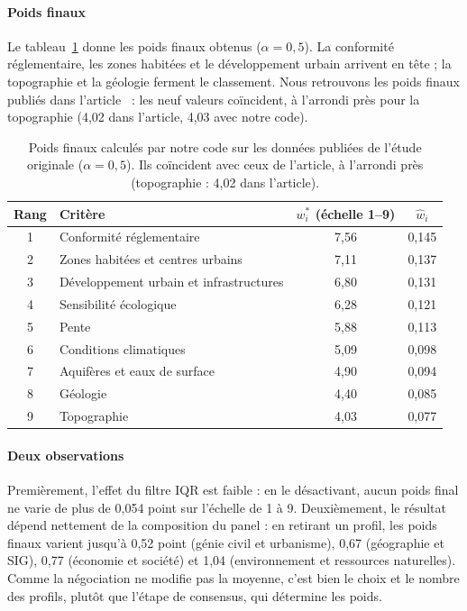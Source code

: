 \documentclass[11pt,a4paper]{article}
\begin{document}
\paragraph{Poids finaux} Le tableau~\ref{tab:poids-orig} donne les poids finaux obtenus ($\alpha=0{,}5$). La conformité réglementaire, les zones habitées et le développement urbain arrivent en tête ; la topographie et la géologie ferment le classement. Nous retrouvons les poids finaux publiés dans l'article~\cite{vahidnia} : les neuf valeurs coïncident, à l'arrondi près pour la topographie (4,02 dans l'article, 4,03 avec notre code).

\begin{table}[htbp]
\centering
\caption{Poids finaux calculés par notre code sur les données publiées de l'étude originale ($\alpha=0{,}5$). Ils coïncident avec ceux de l'article, à l'arrondi près (topographie : 4,02 dans l'article).}
\label{tab:poids-orig}
\small
\begin{tabular}{@{}cl cc@{}}
\toprule
Rang & Critère & $w_i^*$ (échelle 1--9) & $\hat w_i$ \\
\midrule
1 & Conformité réglementaire & 7,56 & 0,145 \\
2 & Zones habitées et centres urbains & 7,11 & 0,137 \\
3 & Développement urbain et infrastructures & 6,80 & 0,131 \\
4 & Sensibilité écologique & 6,28 & 0,121 \\
5 & Pente & 5,88 & 0,113 \\
6 & Conditions climatiques & 5,09 & 0,098 \\
7 & Aquifères et eaux de surface & 4,90 & 0,094 \\
8 & Géologie & 4,40 & 0,085 \\
9 & Topographie & 4,03 & 0,077 \\
\bottomrule
\end{tabular}
\end{table}

\paragraph{Deux observations} Premièrement, l'effet du filtre IQR est faible : en le désactivant, aucun poids final ne varie de plus de 0,054 point sur l'échelle de 1 à 9. Deuxièmement, le résultat dépend nettement de la composition du panel : en retirant un profil, les poids finaux varient jusqu'à 0,52 point (génie civil et urbanisme), 0,67 (géographie et SIG), 0,77 (économie et société) et 1,04 (environnement et ressources naturelles). Comme la négociation ne modifie pas la moyenne, c'est bien le choix et le nombre des profils, plutôt que l'étape de consensus, qui détermine les poids.
\end{document}
